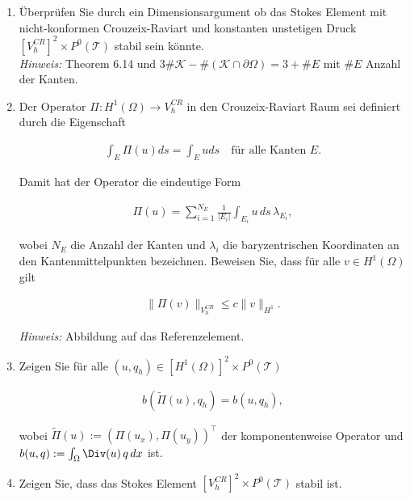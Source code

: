 
\begin{exercise}

\phantom{}

\begin{enumerate}[label = \textbf{\alph*)}]
  \item Überprüfen Sie durch ein Dimensionsargument ob das Stokes Element mit
  nicht-konformen Crouzeix-Raviart und konstanten unstetigen Druck
  $[V_h^{CR}]^2 \times P^0(\mathcal{T})$ stabil sein könnte. \\
  \textit{Hinweis:} Theorem 6.14 und
  $3\#\mathcal{K} - \#(\mathcal{K}\cap \partial\Omega) = 3 + \# E$ mit $\# E$
  Anzahl der Kanten.
  \item Der Operator $\Pi: H^1(\Omega) \to V_h^{CR}$ in den Crouzeix-Raviart Raum
  sei definiert durch die Eigenschaft

  \begin{align}
    \int_E \Pi(u) ds = \int_E u ds \quad \text{für alle Kanten } E.
  \end{align}

  Damit hat der Operator die eindeutige Form

  \begin{align}
    \Pi(u) = \sum_{i=1}^{N_E} \frac{1}{|E_i|}\int_{E_i} u\, ds\, \lambda_{E_i},
  \end{align}

  wobei $N_E$ die Anzahl der Kanten und $\lambda_i$ die baryzentrischen Koordinaten
  an den Kantenmittelpunkten bezeichnen. Beweisen Sie, dass für alle $v \in H^1(\Omega)$ gilt

  \begin{align}
    \|\Pi(v)\|_{V_h^{CR}} \leq c\|v\|_{H^1}.
  \end{align}

    \textit{Hinweis:} Abbildung auf das Referenzelement.

    \item Zeigen Sie für alle $(u,q_h) \in [H^1(\Omega)]^2 \times P^0(\mathcal{T})$

    \begin{align}
      b(\tilde{\Pi}(u),q_h) = b(u,q_h),
    \end{align}

    wobei $\tilde{\Pi}(u) := (\Pi(u_x),\Pi(u_y))^\top$ der komponentenweise
    Operator und $b(u,q) := \int_\Omega \Div(u)\, q\, dx$ ist.

    \item Zeigen Sie, dass das Stokes Element $[V_h^{CR}]^2 \times P^0(\mathcal{T})$ stabil ist.

\end{enumerate}

\end{exercise}

